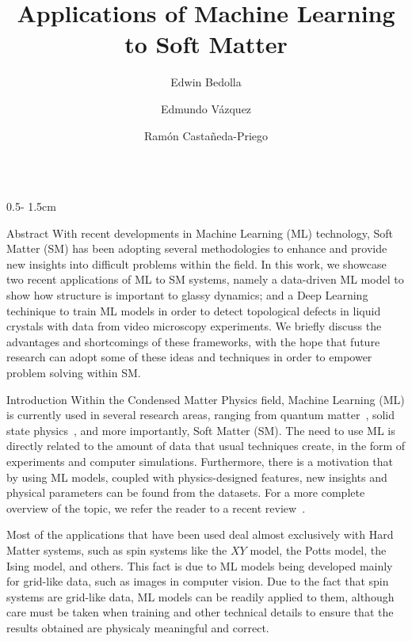 \documentclass{uioposter}
\title{Applications of Machine Learning to Soft Matter}
\author
{%
    Edwin Bedolla\inst{1, $\dagger$}
    \and
    Edmundo Vázquez\inst{1}
    \and
    Ramón Castañeda-Priego\inst{1,2}
}
\institute
{
    \inst{1} División de Ciencias e Ingenierías
    \and
    \inst{2} Departamento de Ingeniería Física
}
\begin{document}
\begin{frame}
\begin{columns}[onlytextwidth]


\begin{column}{0.5\textwidth - 1.5cm}
    \begin{alertblock}{Abstract}
        With recent developments in Machine Learning (ML) technology, Soft Matter (SM) has been adopting several methodologies to enhance and provide new insights into difficult problems within the field. In this work, we showcase two recent applications of ML to SM systems, namely a data-driven ML model to show how structure is important to glassy dynamics; and a Deep Learning techinique to train ML models in order to detect topological defects in liquid crystals with data from video microscopy experiments. We briefly discuss the advantages and shortcomings of these frameworks, with the hope that future research can adopt some of these ideas and techniques in order to empower problem solving within SM.
    \end{alertblock}

    \begin{block}{Introduction}
        Within the Condensed Matter Physics field, Machine Learning (ML) is currently used in several research areas, ranging from
        quantum matter~\cite{carrasquilla_2020}, solid state physics~\cite{schmidt2019recent}, and more importantly, Soft Matter (SM). 
        The need to use ML is directly related to the amount of data that usual techniques
        create, in the form of experiments and computer simulations.
        Furthermore, there is a motivation that by using ML models, coupled with physics-designed
        features, new insights and physical parameters can be found from the datasets.
        For a more complete overview of the topic, we
        refer the reader to a recent review~\cite{bedolla2020}.

        Most of the applications that have been used deal almost exclusively with
        Hard Matter systems, such as spin systems like the $XY$ model, the Potts model,
        the Ising model, and others. This fact is due to ML models being developed
        mainly for grid-like data, such as images in computer vision. 
        Due to the fact that spin systems are grid-like data, ML models can be
        readily applied to them, although care must be taken when training and other
        technical details to ensure that the results obtained are physicaly meaningful
        and correct.


\end{block}
\end{column}
\end{columns}
\end{frame}
\end{document}

